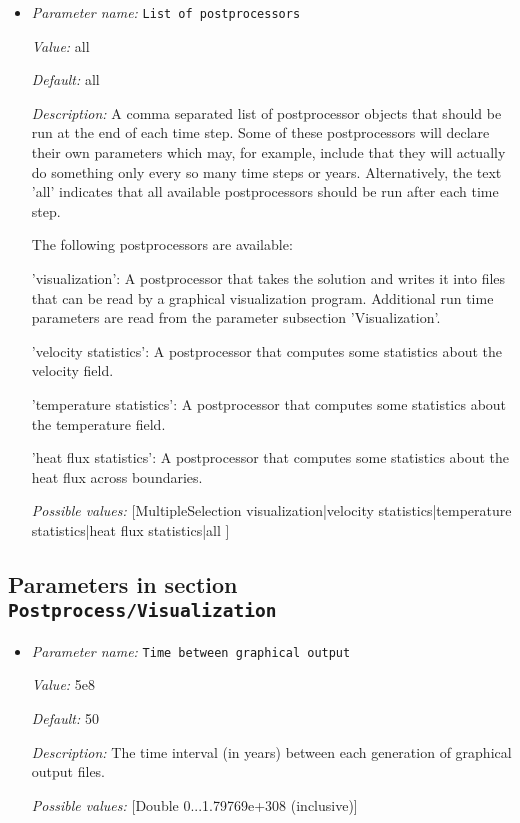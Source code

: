 \begin{itemize}
\item {\it Parameter name:} {\tt List of postprocessors}


{\it Value:} all


{\it Default:} all


{\it Description:} A comma separated list of postprocessor objects that should be run at the end of each time step. Some of these postprocessors will declare their own parameters which may, for example, include that they will actually do something only every so many time steps or years. Alternatively, the text 'all' indicates that all available postprocessors should be run after each time step.

The following postprocessors are available:

'visualization': A postprocessor that takes the solution and writes it into files that can be read by a graphical visualization program. Additional run time parameters are read from the parameter subsection 'Visualization'.

'velocity statistics': A postprocessor that computes some statistics about the velocity field.

'temperature statistics': A postprocessor that computes some statistics about the temperature field.

'heat flux statistics': A postprocessor that computes some statistics about the heat flux across boundaries.


{\it Possible values:} [MultipleSelection visualization|velocity statistics|temperature statistics|heat flux statistics|all ]
\end{itemize}



\subsection{Parameters in section \tt Postprocess/Visualization}

\begin{itemize}
\item {\it Parameter name:} {\tt Time between graphical output}


{\it Value:} 5e8


{\it Default:} 50


{\it Description:} The time interval (in years) between each generation of graphical output files.


{\it Possible values:} [Double 0...1.79769e+308 (inclusive)]
\end{itemize}
